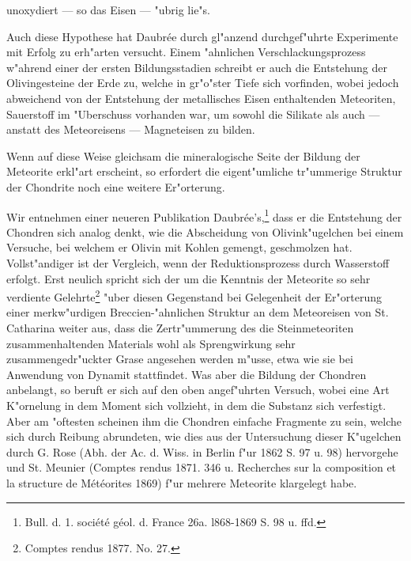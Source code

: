 \documentclass[a4paper, 11pt, oneside]{article}
\begin{document}
unoxydiert --- so das Eisen --- "ubrig lie"s.

Auch diese Hypothese hat Daubrée durch gl"anzend durchgef"uhrte Experimente mit Erfolg zu erh"arten versucht. Einem "ahnlichen Verschlackungsprozess w"ahrend einer der ersten Bildungsstadien schreibt er auch die Entstehung der Olivingesteine der Erde zu, welche in gr"o"ster Tiefe sich vorfinden, wobei jedoch abweichend von der Entstehung der metallisches Eisen enthaltenden Meteoriten, Sauerstoff im "Uberschuss vorhanden war, um sowohl die Silikate als auch --- anstatt des Meteoreisens --- Magneteisen zu bilden.

Wenn auf diese Weise gleichsam die mineralogische Seite der Bildung der Meteorite erkl"art erscheint, so erfordert die eigent"umliche tr"ummerige Struktur der Chondrite noch eine weitere Er"orterung.

Wir entnehmen einer neueren Publikation Daubrée's,\footnote{Bull. d. 1. société géol. d. France 26a. l868-1869 S. 98 u. ffd.} dass er die Entstehung der Chondren sich analog denkt, wie die Abscheidung von Olivink"ugelchen bei einem Versuche, bei welchem er Olivin mit Kohlen gemengt, geschmolzen hat. Vollst"andiger ist der Vergleich, wenn der Reduktionsprozess durch Wasserstoff erfolgt. Erst neulich spricht sich der um die Kenntnis der Meteorite so sehr verdiente Gelehrte\footnote{Comptes rendus 1877. No. 27.} "uber diesen Gegenstand bei Gelegenheit der Er"orterung einer merkw"urdigen Breccien-"ahnlichen Struktur an dem Meteoreisen von St. Catharina weiter aus, dass die Zertr"ummerung des die Steinmeteoriten zusammenhaltenden Materials wohl als Sprengwirkung sehr zusammengedr"uckter Grase angesehen werden m"usse, etwa wie sie bei Anwendung von Dynamit stattfindet. Was aber die Bildung der Chondren anbelangt, so beruft er sich auf den oben angef"uhrten Versuch, wobei eine Art K"ornelung in dem Moment sich vollzieht, in dem die Substanz sich verfestigt. Aber am "oftesten scheinen ihm die Chondren einfache Fragmente zu sein, welche sich durch Reibung abrundeten, wie dies aus der Untersuchung dieser K"ugelchen durch G. Rose (Abh. der Ac. d. Wiss. in Berlin f"ur 1862 S. 97 u. 98) hervorgehe und St. Meunier (Comptes rendus 1871. 346 u. Recherches sur la composition et la structure de Météorites 1869) f"ur mehrere Meteorite klargelegt habe.
\end{document}
